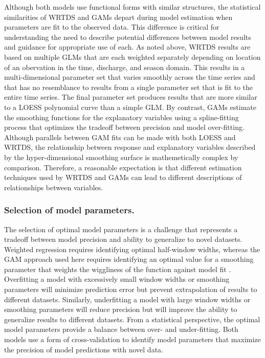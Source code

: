 \documentclass[letterpaper,12pt,oneside]{article}\usepackage[]{graphicx}\usepackage[]{color}
\begin{document}
Although both models use functional forms with similar structures, the statistical similarities of \ac{WRTDS} and \acp{GAM} depart during model estimation when parameters are fit to the observed data.  This difference is critical for understanding the need to describe potential differences between model results and guidance for appropriate use of each. As noted above, \ac{WRTDS} results are based on multiple \acp{GLM} that are each weighted separately depending on location of an obervation in the time, discharge, and season domain.  This results in a multi-dimensional parameter set that varies smoothly across the time series and that has no resemblance to results from a single parameter set that is fit to the entire time series.  The final parameter set produces results that are more similar to a \ac{LOESS} polynomial curve \citep[i.e.,][]{Cleveland79} than a simple \ac{GLM}. By contrast, \acp{GAM} estimate the smoothing functions for the explanatory variables using a spline-fitting process that optimizes the tradeoff between precision and model over-fitting.  Although parallels between \ac{GAM} fits can be made with both \ac{LOESS} and \ac{WRTDS}, the relationship between response and explanatory variables described by the hyper-dimensional smoothing surface is mathemetically complex by comparison.  Therefore, a reasonable expectation is that different estimation techniques used by \ac{WRTDS} and \acp{GAM} can lead to different descriptions of relationships between variables.

\subsubsection*{\hspace*{0.25in}Selection of model parameters.}

The selection of optimal model parameters is a challenge that represents a tradeoff between model precision and ability to generalize to novel datasets.  Weighted regression requires identifying optimal half-window widths, whereas the \ac{GAM} approach used here requires identifying an optimal value for a smoothing parameter that weights the wiggliness of the function against model fit \citep{Wood06}.  Overfitting a model with excessively small window widths or smoothing parameters will minimize prediction error but prevent extrapolation of results to different datasets. Similarly, underfitting a model with large window widths or smoothing parameters will reduce precision but will improve the ability to generalize results to different datasets. From a statistical perspective, the optimal model parameters provide a balance between over- and under-fitting.  Both models use a form of cross-validation to identify model parameters that maximize the precision of model predictions with novel data.   
\end{document}
